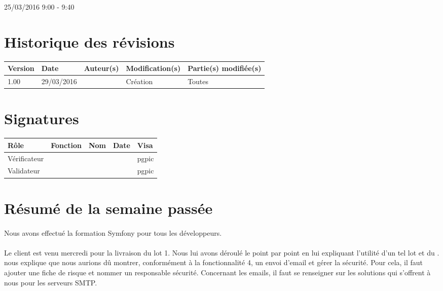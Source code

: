\documentclass [a4paper] {article}
\begin{document}
25/03/2016			 				%
\hfill   
\hfill 	 9:00 - 9:40 				%


\section*{Historique des révisions}
\begin{center}
			\begin{tabular}{| p{2.5cm} | p{3cm} | p{3cm} | p{3cm} | p{3.5cm} |}
				\hline
				\rowcolor{Gray}
				Version & Date & Auteur(s) & Modification(s) & Partie(s) modifiée(s)		 \\
				\hline
				1.00 & 29/03/2016 & \Pierre & Création & Toutes \\
		\hline		
			\end{tabular}
		\end{center}

\section*{Signatures}

		\begin{center}
			\begin{tabular}{| p{2.5cm} | p{4cm} | p{3cm} | p{3cm} | p{2.5cm} |}
				\hline
				\rowcolor{Gray}
				Rôle & Fonction & Nom & Date & Visa		 \\
				\hline
				Vérificateur & \RQA & \Kafui &  & pgpic \\[30pt]
				\hline
				Validateur & \CP & \Sergi &  & pgpic \\[30pt]	
				\hline
			\end{tabular}
		\end{center}


\section{Résumé de la semaine passée}
\paragraph*{}
Nous avons effectué la formation Symfony pour tous les développeurs.

\paragraph*{}
Le client est venu mercredi pour la livraison du lot 1. Nous lui avons déroulé le \CDR{} point par point en lui expliquant l'utilité d'un tel lot et du \CDR{}. \nomTuteurPedago{} nous explique que nous aurions dû montrer, conformément à la fonctionnalité 4, un envoi d'email et gérer la sécurité. Pour cela, il faut ajouter une fiche de risque et nommer un responsable sécurité. Concernant les emails, il faut se renseigner sur les solutions qui s'offrent à nous pour les serveurs SMTP.
\end{document}
